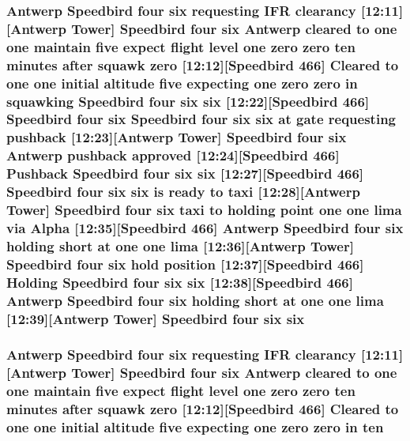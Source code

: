 \subsubsection[{\texorpdfstring{six}{six}}]{\setlength{\rightskip}{0pt plus 5cm}Antwerp Speedbird four six requesting I\+FR clearancy \mbox{[}12\+:11\mbox{]}\mbox{[}Antwerp {\bf Tower}\mbox{]} Speedbird four six Antwerp cleared to {\bf one} {\bf one} maintain five expect flight level {\bf one} {\bf zero} {\bf zero} {\bf ten} minutes after squawk {\bf zero} \mbox{[}12\+:12\mbox{]}\mbox{[}Speedbird 466\mbox{]} Cleared to {\bf one} {\bf one} initial altitude five expecting {\bf one} {\bf zero} {\bf zero} in {\bf squawking} Speedbird four six six \mbox{[}12\+:22\mbox{]}\mbox{[}Speedbird 466\mbox{]} Speedbird four six Speedbird four six six at gate requesting pushback \mbox{[}12\+:23\mbox{]}\mbox{[}Antwerp {\bf Tower}\mbox{]} Speedbird four six Antwerp pushback {\bf approved} \mbox{[}12\+:24\mbox{]}\mbox{[}Speedbird 466\mbox{]} Pushback Speedbird four six six \mbox{[}12\+:27\mbox{]}\mbox{[}Speedbird 466\mbox{]} Speedbird four six six is ready to taxi \mbox{[}12\+:28\mbox{]}\mbox{[}Antwerp {\bf Tower}\mbox{]} Speedbird four six taxi to holding point {\bf one} {\bf one} {\bf lima} via {\bf Alpha} \mbox{[}12\+:35\mbox{]}\mbox{[}Speedbird 466\mbox{]} Antwerp Speedbird four six holding short at {\bf one} {\bf one} {\bf lima} \mbox{[}12\+:36\mbox{]}\mbox{[}Antwerp {\bf Tower}\mbox{]} Speedbird four six hold {\bf position} \mbox{[}12\+:37\mbox{]}\mbox{[}Speedbird 466\mbox{]} Holding Speedbird four six six \mbox{[}12\+:38\mbox{]}\mbox{[}Speedbird 466\mbox{]} Antwerp Speedbird four six holding short at {\bf one} {\bf one} {\bf lima} \mbox{[}12\+:39\mbox{]}\mbox{[}Antwerp {\bf Tower}\mbox{]} Speedbird four six six}\hypertarget{happyDay5ATC_8txt_a57978282a95204080c8ffb626c7d0bd5}{}\label{happyDay5ATC_8txt_a57978282a95204080c8ffb626c7d0bd5}
\subsubsection[{\texorpdfstring{ten}{ten}}]{\setlength{\rightskip}{0pt plus 5cm}Antwerp Speedbird four {\bf six} requesting I\+FR clearancy \mbox{[}12\+:11\mbox{]}\mbox{[}Antwerp {\bf Tower}\mbox{]} Speedbird four {\bf six} Antwerp cleared to {\bf one} {\bf one} maintain five expect flight level {\bf one} {\bf zero} {\bf zero} ten minutes after squawk {\bf zero} \mbox{[}12\+:12\mbox{]}\mbox{[}Speedbird 466\mbox{]} Cleared to {\bf one} {\bf one} initial altitude five expecting {\bf one} {\bf zero} {\bf zero} in ten}\hypertarget{happyDay5ATC_8txt_ab9794f8235db42812d8ddd9368cb321e}{}\label{happyDay5ATC_8txt_ab9794f8235db42812d8ddd9368cb321e}
